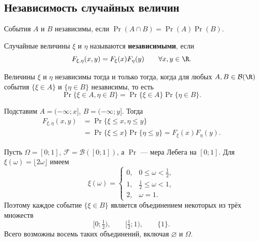 \newpage
\subsection{Независимость случайных величин}

События $A$ и $B$ независимы, если $\Pr(A\cap B)=\Pr(A)\Pr(B)$.

\begin{definition}
    Случайные величины $\xi$ и $\eta$ называются \textbf{независимыми}, если
    \[
        F_{\xi,\eta}(x,y)=F_\xi(x)F_\eta(y)
        \qquad\forall x,y\in\R.
    \]
\end{definition}

\begin{theorem}
    Величины $\xi$ и $\eta$ независимы тогда и только тогда, когда
    для любых $A,B\in\mathcal B(\R)$ события $\{\xi\in A\}$ и $\{\eta\in B\}$
    независимы, то есть
    \[
        \Pr\{\xi\in A,\eta\in B\}
        =\Pr\{\xi\in A\}\Pr\{\eta\in B\}.
    \]
\end{theorem}

\begin{Proof}
    Подставим $A=(-\infty;x]$, $B=(-\infty;y]$. Тогда
    \[
        \begin{aligned}
            F_{\xi,\eta}(x,y)
            &=\Pr\{\xi\leq x,\eta\leq y\}\\
            &=\Pr\{\xi\leq x\}\Pr\{\eta\leq y\}
             =F_\xi(x)F_\eta(y).
        \end{aligned}
    \]
\end{Proof}

\begin{example}
    Пусть $\Omega=[0;1]$, $\mathcal F=\mathcal B([0;1])$, а $\Pr$ ---
    мера Лебега на $[0;1]$. Для $\xi(\omega)=\lfloor2\omega\rfloor$ имеем
    \[
        \xi(\omega)=
        \begin{cases}
            0,&0\leq\omega<\frac12,\\
            1,&\frac12\leq\omega<1,\\
            2,&\omega=1.
        \end{cases}
    \]
    Поэтому каждое событие $\{\xi\in B\}$ является объединением некоторых
    из трёх множеств
    \[
        [0;\tfrac12),\qquad[\tfrac12;1),\qquad\{1\}.
    \]
    Всего возможны восемь таких объединений, включая $\varnothing$ и $\Omega$.
\end{example}

